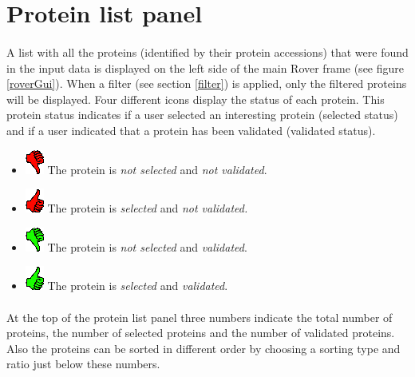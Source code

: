 \documentclass[11pt,a4paper,oneside,notitlepage]{book}
\begin{document}
\section{Protein list panel}\label{Protein list}

\paragraph{}A list with all the proteins (identified by their protein accessions) that were found in the input data is displayed on the left side of the main Rover frame (see figure \ref{roverGui}). When a filter (see section \ref{filter}) is applied, only the filtered proteins will be displayed. Four different icons display the status of each protein. This protein status indicates if a user selected an interesting protein (selected status) and if a user indicated that a protein has been validated (validated status).

\begin{itemize}
\item \includegraphics[scale=0.6, H]{thumbsDownRed.png} The protein is \textit{not selected} and \textit{not validated}.
\item \includegraphics[scale=0.6, H]{thumbsUpRed.png} The protein is \textit{selected} and \textit{not validated.}
\item \includegraphics[scale=0.6, H]{thumbsDownGreen.png} The protein is \textit{not selected} and \textit{validated}.
\item \includegraphics[scale=0.6, H]{thumbsUpGreen.png} The protein is \textit{selected} and \textit{validated}.
\end{itemize}

\paragraph{}At the top of the protein list panel three numbers indicate the total number of proteins, the number of selected proteins and the number of validated proteins. Also the proteins can be sorted in different order by choosing a sorting type and ratio just below these numbers.
\end{document}
